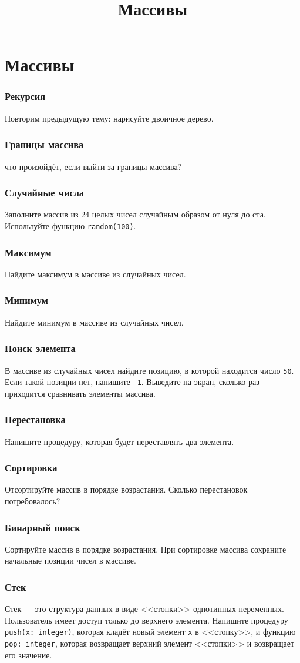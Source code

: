 \documentclass[10,a5paper]{article}
\title{Массивы}
\begin{document}
\section{Массивы}
\subsubsection{Рекурсия}
Повторим предыдущую тему: нарисуйте двоичное дерево.
\subsubsection{Границы массива}
что произойдёт, если выйти за границы массива?
\subsubsection{Случайные числа}
Заполните массив из 24 целых чисел случайным образом от нуля до ста.
Используйте функцию \texttt{random(100)}.
\subsubsection{Максимум}
Найдите максимум в массиве из случайных чисел.
\subsubsection{Минимум}
Найдите минимум в массиве из случайных чисел.
\subsubsection{Поиск элемента}
В массиве из случайных чисел найдите позицию, в которой находится число
\texttt{50}. Если такой позиции нет, напишите \texttt{-1}. Выведите на
экран, сколько раз приходится сравнивать элементы массива.
\subsubsection{Перестановка}
Напишите процедуру, которая будет переставлять два элемента.
\subsubsection{Сортировка}
Отсортируйте массив в порядке возрастания. Сколько перестановок
потребовалось?
\subsubsection{Бинарный поиск}
Сортируйте массив в порядке возрастания.
При сортировке массива сохраните начальные позиции чисел в массиве.
\subsubsection{Стек}
Стек --- это структура данных в виде <<стопки>> однотипных переменных.
Пользователь имеет доступ только до верхнего элемента.
Напишите процедуру \texttt{push(x: integer)}, которая кладёт новый
элемент \texttt{x} в <<стопку>>, и функцию \texttt{pop: integer},
которая возвращает верхний элемент <<стопки>> и возвращает его значение.
\end{document}
